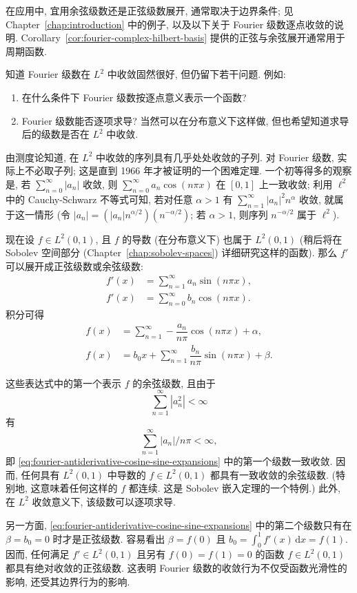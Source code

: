 在应用中, 宜用余弦级数还是正弦级数展开, 通常取决于边界条件; 见 Chapter~\ref{chap:introduction} 中的例子, 以及以下关于 Fourier 级数逐点收敛的说明. Corollary~\ref{cor:fourier-complex-hilbert-basis} 提供的正弦与余弦展开通常用于周期函数.

知道 Fourier 级数在 $L^2$ 中收敛固然很好, 但仍留下若干问题. 例如:\begin{enumerate}
\item 在什么条件下 Fourier 级数按逐点意义表示一个函数?
\item Fourier 级数能否逐项求导? 当然可以在分布意义下这样做, 但也希望知道求导后的级数是否在 $L^2$ 中收敛.
\end{enumerate}

由测度论知道, 在 $L^2$ 中收敛的序列具有几乎处处收敛的子列. 对 Fourier 级数, 实际上不必取子列; 这是直到 1966 年才被证明的一个困难定理. 一个初等得多的观察是, 若 $\sum_{n=0}^\infty|a_n|$ 收敛, 则 $\sum_{n=0}^\infty a_n\cos(n\pi x)$ 在 $[0,1]$ 上一致收敛; 利用 $\ell^2$ 中的 Cauchy-Schwarz 不等式可知, 若对任意 $\alpha>1$ 有 $\sum_{n=1}^\infty|a_n|^2n^\alpha$ 收敛, 就属于这一情形 (令 $|a_n|=(|a_n|n^{\alpha/2})(n^{-\alpha/2})$; 若 $\alpha>1$, 则序列 $n^{-\alpha/2}$ 属于 $\ell^2$).

现在设 $f\in L^2(0,1)$, 且 $f$ 的导数 (在分布意义下) 也属于 $L^2(0,1)$ (稍后将在 Sobolev 空间部分 (Chapter~\ref{chap:sobolev-spaces}) 详细研究这样的函数). 那么 $f'$ 可以展开成正弦级数或余弦级数:
\begin{equation}\label{eq:fourier-derivative-sine-cosine-expansions}
\begin{aligned}
f'(x)&=\sum_{n=1}^\infty a_n\sin(n\pi x),\\
f'(x)&=\sum_{n=0}^\infty b_n\cos(n\pi x).
\end{aligned}
\end{equation}
积分可得
\begin{equation}\label{eq:fourier-antiderivative-cosine-sine-expansions}
\begin{aligned}
f(x)&=\sum_{n=1}^\infty-\dfrac{a_n}{n\pi}\cos(n\pi x)+\alpha,\\
f(x)&=b_0x+\sum_{n=1}^\infty\dfrac{b_n}{n\pi}\sin(n\pi x)+\beta.
\end{aligned}
\end{equation}


这些表达式中的第一个表示 $f$ 的余弦级数, 且由于 \[\sum_{n=1}^\infty|a_n^2|<\infty\] 有 \[\sum_{n=1}^\infty|a_n|/n\pi<\infty,\] 即 \eqref{eq:fourier-antiderivative-cosine-sine-expansions} 中的第一个级数一致收敛. 因而, 任何具有 $L^2(0,1)$ 中导数的 $f\in L^2(0,1)$ 都具有一致收敛的余弦级数. (特别地, 这意味着任何这样的 $f$ 都连续. 这是 Sobolev 嵌入定理的一个特例.) 此外, 在 $L^2$ 收敛意义下, 该级数可以逐项求导.

另一方面, \eqref{eq:fourier-antiderivative-cosine-sine-expansions} 中的第二个级数只有在 $\beta=b_0=0$ 时才是正弦级数. 容易看出 $\beta=f(0)$ 且 $b_0=\int_0^1 f'(x)\,\mathrm{d}x=f(1)$. 因而, 任何满足 $f'\in L^2(0,1)$ 且另有 $f(0)=f(1)=0$ 的函数 $f\in L^2(0,1)$ 都具有绝对收敛的正弦级数. 这表明 Fourier 级数的收敛行为不仅受函数光滑性的影响, 还受其边界行为的影响.
